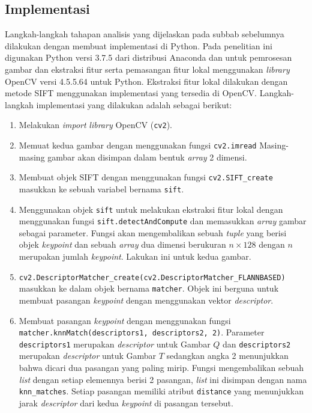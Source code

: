 \subsection{Implementasi}
\label{subsec:tahapan_implementasi_analisis_poi}
Langkah-langkah tahapan analisis yang dijelaskan pada subbab sebelumnya dilakukan dengan membuat implementasi di Python. Pada penelitian ini digunakan Python versi 3.7.5 dari distribusi Anaconda dan untuk pemrosesan gambar dan ekstraksi fitur serta pemasangan fitur lokal menggunakan \textit{library} OpenCV versi 4.5.5.64 untuk Python. Ekstraksi fitur lokal dilakukan dengan metode SIFT menggunakan implementasi yang tersedia di OpenCV. Langkah-langkah implementasi yang dilakukan adalah sebagai berikut:
\begin{enumerate}
	\item Melakukan \textit{import} \textit{library} OpenCV (\texttt{cv2}). 
	\item Memuat kedua gambar dengan menggunakan fungsi \texttt{cv2.imread} Masing-masing gambar akan disimpan dalam bentuk \textit{array} 2 dimensi.
	\item Membuat objek SIFT dengan menggunakan fungsi \texttt{cv2.SIFT\_create} masukkan ke sebuah variabel bernama \texttt{sift}. 
	\item Menggunakan objek \texttt{sift} untuk melakukan ekstraksi fitur lokal dengan menggunakan fungsi \texttt{sift.detectAndCompute} dan memasukkan \textit{array} gambar sebagai parameter. Fungsi akan mengembalikan sebuah \textit{tuple} yang berisi objek \textit{keypoint} dan sebuah \textit{array} dua dimensi berukuran $n \times 128$ dengan $n$ merupakan jumlah \textit{keypoint}. Lakukan ini untuk kedua gambar.
	\item {} \texttt{cv2.DescriptorMatcher\_create(cv2.DescriptorMatcher\_FLANNBASED)} masukkan ke dalam objek bernama \texttt{matcher}. Objek ini berguna untuk membuat pasangan \textit{keypoint} dengan menggunakan vektor \textit{descriptor}.
	\item Membuat pasangan \textit{keypoint} dengan menggunakan fungsi \texttt{matcher.knnMatch(descriptors1, descriptors2, 2)}. Parameter \texttt{descriptors1} merupakan \textit{descriptor} untuk Gambar $Q$ dan \texttt{descriptors2} merupakan \textit{descriptor} untuk Gambar $T$ sedangkan angka 2 menunjukkan bahwa dicari dua pasangan yang paling mirip. Fungsi mengembalikan sebuah \textit{list} dengan setiap elemennya berisi 2 pasangan, \textit{list} ini disimpan dengan nama \texttt{knn\_matches}. Setiap pasangan memiliki atribut \texttt{distance} yang menunjukkan jarak \textit{descriptor} dari kedua \textit{keypoint} di pasangan tersebut. 

\end{enumerate}
